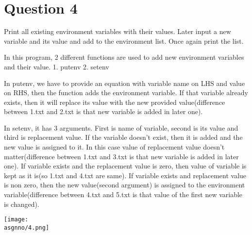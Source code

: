 \documentclass[main.tex]{subfiles}
\begin{document}
\section{Question 4}

Print all existing environment variables with their values. Later input a new
variable and its value and add to the environment list. Once again print the
list.



In this program, 2 different functions are used to add new environment variables
and their value. 1. putenv  2. setenv

In putenv, we have to provide an equation with variable name on LHS and value on
RHS, then the function adds the environment variable. If that variable already
exists, then it will replace its value with the new provided value(difference
between 1.txt and 2.txt is that new variable is added in later one).

In setenv, it has 3 arguments. First is name of variable, second is its value
and third is replacement value. If the variable doesn't exist, then it is added
and the new value is assigned to it. In this case value of replacement value
doesn't matter(difference between 1.txt and 3.txt is that new variable is added
in later one).
If variable exists and the replacement value is zero, then value of variable is
kept as it is(so 1.txt and 4.txt are same).
If variable exists and replacement value is non zero, then the new value(second
argument) is assigned to the environment variable(difference between 4.txt and
5.txt is that value of the first new variable is changed).

\centering\texttt{[image: \\asgnno/4.png]}
\clearpage
\end{document}
